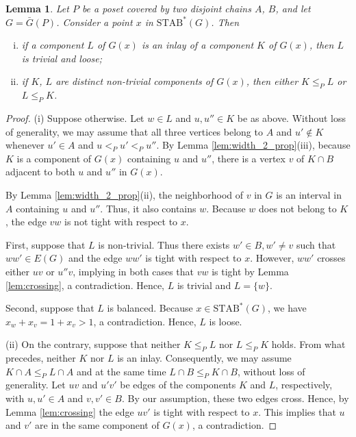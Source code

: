 \documentclass{article} \usepackage{fullpage}
\newtheorem{lemma}{Lemma}
\newcommand{\STAB}{\mathrm{STAB}}
\begin{document}
\begin{lemma}
\label{lem:int}
Let $P$ be a poset covered by two disjoint chains $A$, $B$, and let $G = \bar{G}(P)$. Consider a point $x$ in $\STAB^*(G)$. Then
\begin{enumerate}[(i)]
\item if a component $L$ of $G(x)$ is an inlay of a component $K$ of $G(x)$, then $L$ is trivial and loose;
\item if $K$, $L$ are distinct non-trivial components of $G(x)$, then either $K \leqslant_P L$ or $L \leqslant_P K$.
\end{enumerate}
\end{lemma}
\begin{proof}
(i) Suppose otherwise. Let $w \in L$ and $u, u'' \in K$ be as above. Without loss of generality, we may assume that all three vertices belong to $A$ and $u' \notin K$ whenever $u' \in A$ and $u <_P u' <_P u''$. By Lemma \ref{lem:width_2_prop}(iii), because $K$ is a component of $G(x)$ containing $u$ and $u''$, there is a vertex $v$ of $K \cap B$ adjacent to both $u$ and $u''$ in $G(x)$.

By Lemma \ref{lem:width_2_prop}(ii), the neighborhood of $v$ in $G$ is an interval in $A$ containing $u$ and $u''$. Thus, it also contains $w$. Because $w$ does not belong to $K$, the edge $vw$ is not tight with respect to $x$. 

First, suppose that $L$ is non-trivial. Thus there exists $w' \in B, w' \neq v$ such that $ww' \in E(G)$ and the edge $ww'$ is tight with respect to $x$. However, $ww'$ crosses either $uv$ or $u''v$, implying in both cases that $vw$ is tight by Lemma \ref{lem:crossing}, a contradiction. Hence, $L$ is trivial and $L = \{w\}$.

Second, suppose that $L$ is balanced. Because $x \in \STAB^*(G)$, we have $x_w + x_v = 1 + x_v > 1$, a contradiction. Hence, $L$ is loose.

(ii) On the contrary, suppose that neither $K \leqslant_P L$ nor $L \leqslant_P K$ holds. From what precedes, neither $K$ nor $L$ is an inlay. Consequently, we may assume $K \cap A \leqslant_P L \cap A$ and at the same time $L \cap B \leqslant_P K \cap B$, without loss of generality. Let $uv$ and $u'v'$ be edges of the components $K$ and $L$, respectively, with $u,u' \in A$ and $v,v' \in B$. By our assumption, these two edges cross. Hence, by Lemma \ref{lem:crossing} the edge $uv'$ is tight with respect to $x$. This implies that $u$ and $v'$ are in the same component of $G(x)$, a contradiction. 
\end{proof}
  
\end{document}
